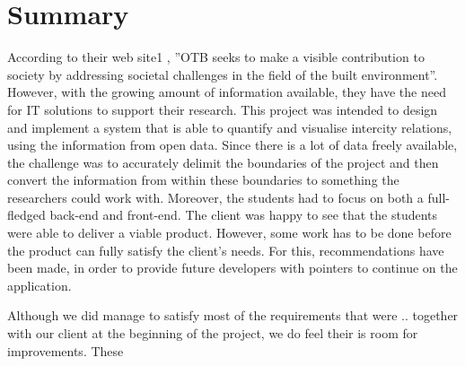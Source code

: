\newpage

\chapter*{Summary}

According to their web site1 , ”OTB seeks to make a visible contribution to society by addressing societal challenges in the field of the built environment”. However, with the growing amount of information available, they have the need for IT solutions to support their research. This project was intended to design and implement a system that is able to quantify and visualise intercity relations, using the information from open data. Since there is a lot of data freely available, the challenge was to accurately delimit the boundaries of the project and then convert the information from within these boundaries to something the researchers could work with. Moreover, the students had to focus on both a full-fledged back-end and front-end. The client was happy to see that the students were able to deliver a viable product. However, some work has to be done before the product can fully satisfy the client’s needs. For this, recommendations have been made, in order to provide future developers with pointers to continue on the application.






Although we did manage to satisfy most of the requirements that were .. together with our client at the beginning of the project, we do feel their is room for improvements. These 


